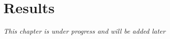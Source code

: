 
\chapter{Results} \label{results-chapter}

\textit{This chapter is under progress and will be added later}

\begin{comment}
\section{Visualization Tool}

\subsection{Example Networks}

The visualization results were generated using two separate example ANNs. The first network is a simple CNN trained on the MNIST dataset, commonly used as a toy problem. This network is quickly trained from scratch to near to perfect accuracy, which allowed us to show how the visualizations evolve throughout the training progress. The second network is the more advanced VGG16 model. In this case, we used a fully trained model with weights pretrained on ImageNet. Some of the visualizations, for instance deconvolution, need a larger network with several convolutional layers to demonstrate their full capabilities. Using the fully trained VGG16 model, we could present a second set of visualizations that showcase more complex features and also deals with RGB images instead of grayscale, as in the MNIST network. Both networks follow examples provided by Keras, and we will describe the implementations and training process in detail in the following sections. \\

\noindent Note that there are several ways to count the number of layers in a network. Some do not include pooling or flatten layers, or even the input and output layers. To ensure consistency when describing the network architectures, we will define the number of layers as the number of Keras layers, as listed in their documentation.


\subsubsection{The MNIST Network}


\end{comment}
